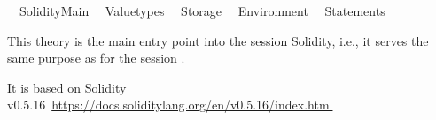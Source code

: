 %
\begin{isabellebody}%
%
%
\isadelimdocument
%
\endisadelimdocument
%
\isatagdocument
%
\isamarkuptrue%
%
\endisatagdocument
{\isafolddocument}%
%
\isadelimdocument
%
\endisadelimdocument
%
\isadelimtheory
%
\endisadelimtheory
%
\isatagtheory
{}\isamarkupfalse%
\isanewline
\ \ Solidity{\isacharunderscore}{\kern0pt}Main\isanewline
{}\isanewline
\ \ Valuetypes\isanewline
\ \ Storage\isanewline
\ \ Environment\isanewline
\ \ Statements\isanewline
{}%
\endisatagtheory
{\isafoldtheory}%
%
\isadelimtheory
%
\endisadelimtheory
%
\begin{isamarkuptext}%
This theory is the main entry point into the session Solidity, i.e., it serves the same purpose
  as  for the session .

  It is based on Solidity v0.5.16~\url{https://docs.soliditylang.org/en/v0.5.16/index.html}%
\end{isamarkuptext}\isamarkuptrue%
%
\isadelimtheory
%
\endisadelimtheory
%
\isatagtheory
{}\isamarkupfalse%
%
\endisatagtheory
{\isafoldtheory}%
%
\isadelimtheory
%
\endisadelimtheory
%
\end{isabellebody}%
\endinput
